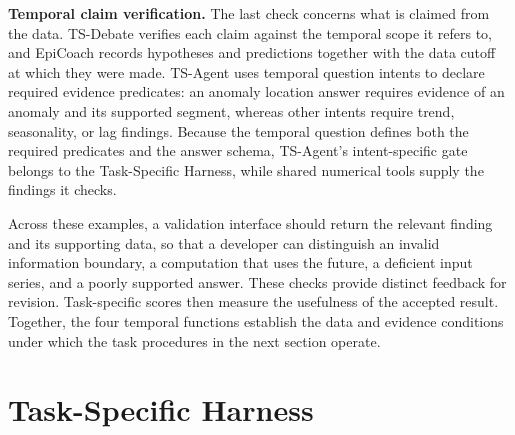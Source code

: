 \documentclass[preprints,article,submit,moreauthors]{Definitions/mdpi}
\begin{document}
\noindent\textbf{Temporal claim verification.} The last check concerns what is claimed from the data. TS-Debate \citep{multimodaldebate2026} verifies each claim against the temporal scope it refers to, and EpiCoach \citep{epicoach2026} records hypotheses and predictions together with the data cutoff at which they were made. TS-Agent \citep{tsagent2025} uses temporal question intents to declare required evidence predicates: an anomaly location answer requires evidence of an anomaly and its supported segment, whereas other intents require trend, seasonality, or lag findings. Because the temporal question defines both the required predicates and the answer schema, TS-Agent's intent-specific gate belongs to the Task-Specific Harness, while shared numerical tools supply the findings it checks.

Across these examples, a validation interface should return the relevant finding and its supporting data, so that a developer can distinguish an invalid information boundary, a computation that uses the future, a deficient input series, and a poorly supported answer. These checks provide distinct feedback for revision. Task-specific scores then measure the usefulness of the accepted result. Together, the four temporal functions establish the data and evidence conditions under which the task procedures in the next section operate.

\section{Task-Specific Harness}
\label{sec:task-specific-harness}
\end{document}
